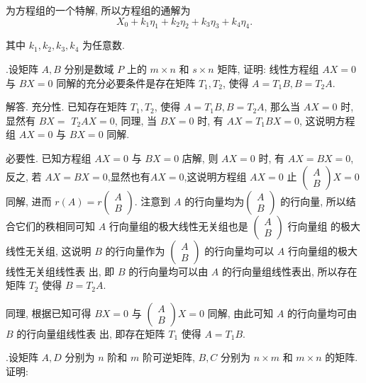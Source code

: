 \documentclass{article}
\begin{document}
为方程组的一个特解, 所以方程组的通解为
$$
    X_{0}+k_{1} \eta_{1}+k_{2} \eta_{2}+k_{3} \eta_{3}+k_{4} \eta_{4} .
$$

其中 $k_{1}, k_{2}, k_{3}, k_{4}$ 为任意数.

\vspace{1ex}
{.}设矩阵 $A, B$ 分别是数域 $P$ 上的 $m \times n$ 和 $s \times n$ 矩阵, 证明: 线性方程组 $A X=0$ 与 $B X=0$ 同解的充分必要条件是存在矩阵 $T_{1}, T_{2}$, 使得 $A=T_{1} B, B=T_{2} A$.

解答. 充分性. 已知存在矩阵 $T_{1}, T_{2}$, 使得 $A=T_{1} B, B=T_{2} A$, 那么当 $A X=0$ 时, 显然有 $B X=$ $T_{2} A X=0$, 同理, 当 $B X=0$ 时, 有 $A X=T_{1} B X=0$, 这说明方程组 $A X=0$ 与 $B X=0$ 同解.

必要性. 已知方程组 $A X=0$ 与 $B X=0$ 店解, 则 $A X=0$ 时, 有 $A X=B X=0$, 反之, 若 $A X=B X=0$,显然也有$A X=0$,这说明方程组 $A X=0$ 止 $\left(\begin{array}{c}A \\ B\end{array}\right) X=0$ 同解, 进而 $r(A)=r\left(\begin{array}{l}A \\ B\end{array}\right) .$ 注意到 $A$ 的行向量均为$\left(\begin{array}{c}A \\ B\end{array}\right)$ 的行向量, 所以结合它们的秩相同可知 $A$ 行向量组的极大线性无关组也是 $\left(\begin{array}{c}A \\ B\end{array}\right)$ 行向量组 的极大线性无关组, 这说明 $B$ 的行向量作为 $\left(\begin{array}{c}A \\ B\end{array}\right)$ 的行向量均可以 $A$ 行向量组的极大线性无关组线性表 出, 即 $B$ 的行向量均可以由 $A$ 的行向量组线性表出, 所以存在矩阵 $T_{2}$ 使得 $B=T_{2} A$.

同理, 根据已知可得 $B X=0$ 与 $\left(\begin{array}{c}A \\ B\end{array}\right) X=0$ 同解, 由此可知 $A$ 的行向量均可由 $B$ 的行向量组线性表 出, 即存在矩阵 $T_{1}$ 使得 $A=T_{1} B .$

\vspace{1ex}
{.}设矩阵 $A, D$ 分别为 $n$ 阶和 $m$ 阶可逆矩阵, $B, C$ 分别为 $n \times m$ 和 $m \times n$ 的矩阵. 证明:
\end{document}
